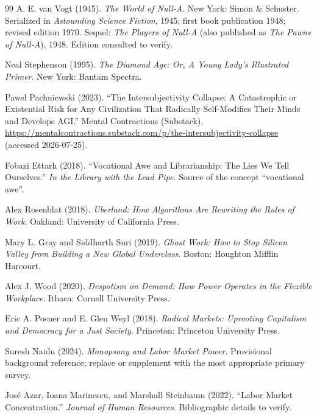 \documentclass[11pt]{article}
\begin{document}
\begin{thebibliography}{99}
A. E. van Vogt (1945). \emph{The World of Null-A}. New York: Simon \& Schuster. Serialized in \emph{Astounding Science Fiction}, 1945; first book publication 1948; revised edition 1970. Sequel: \emph{The Players of Null-A} (also published as \emph{The Pawns of Null-A}), 1948. Edition consulted to verify.

Neal Stephenson (1995). \emph{The Diamond Age: Or, A Young Lady's Illustrated Primer}. New York: Bantam Spectra.

Pawel Pachniewski (2023). ``The Intersubjectivity Collapse: A Catastrophic or Existential Risk for Any Civilization That Radically Self-Modifies Their Minds and Develops {AGI}.'' Mental Contractions (Substack). \url{https://mentalcontractions.substack.com/p/the-intersubjectivity-collapse} (accessed 2026-07-25).

Fobazi Ettarh (2018). ``Vocational Awe and Librarianship: The Lies We Tell Ourselves.'' \emph{In the Library with the Lead Pipe}. Source of the concept ``vocational awe''.

Alex Rosenblat (2018). \emph{Uberland: How Algorithms Are Rewriting the Rules of Work}. Oakland: University of California Press.

Mary L. Gray and Siddharth Suri (2019). \emph{Ghost Work: How to Stop Silicon Valley from Building a New Global Underclass}. Boston: Houghton Mifflin Harcourt.

Alex J. Wood (2020). \emph{Despotism on Demand: How Power Operates in the Flexible Workplace}. Ithaca: Cornell University Press.

Eric A. Posner and E. Glen Weyl (2018). \emph{Radical Markets: Uprooting Capitalism and Democracy for a Just Society}. Princeton: Princeton University Press.

Suresh Naidu (2024). \emph{Monopsony and Labor Market Power}. Provisional background reference; replace or supplement with the most appropriate primary survey.

Jos{\'e} Azar, Ioana Marinescu, and Marshall Steinbaum (2022). ``Labor Market Concentration.'' \emph{Journal of Human Resources}. Bibliographic details to verify.


\end{thebibliography}
\end{document}
